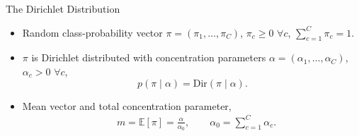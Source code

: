 \begin{frame}{The Dirichlet Distribution}
\label{frm:bg-dirichlet-distribution}
\setlength{\abovedisplayskip}{4pt}
\setlength{\belowdisplayskip}{4pt}
\begin{itemize}
\setlength{\itemsep}{5mm}
\item Random class-probability vector $\pi=(\pi_1,\ldots,\pi_C)$,
$\pi_c\geq0$ $\forall c$, $\sum_{c=1}^{C}\pi_c=1$.

\item $\pi$ is Dirichlet distributed with concentration parameters $\alpha=(\alpha_1,\ldots,\alpha_C)$, $\alpha_c>0$ $\forall c$,
\[
p(\pi\mid\alpha)=\mathrm{Dir}(\pi\mid\alpha).
\]

\item<2-> Mean vector and total concentration parameter,
\[
\begin{aligned}
&m=\mathbb E[\pi]=\frac{\alpha}{\alpha_0},
\qquad \alpha_0=\sum_{c=1}^{C}\alpha_c.\\[4mm]
\end{aligned}
\]
\end{itemize}
\end{frame}

